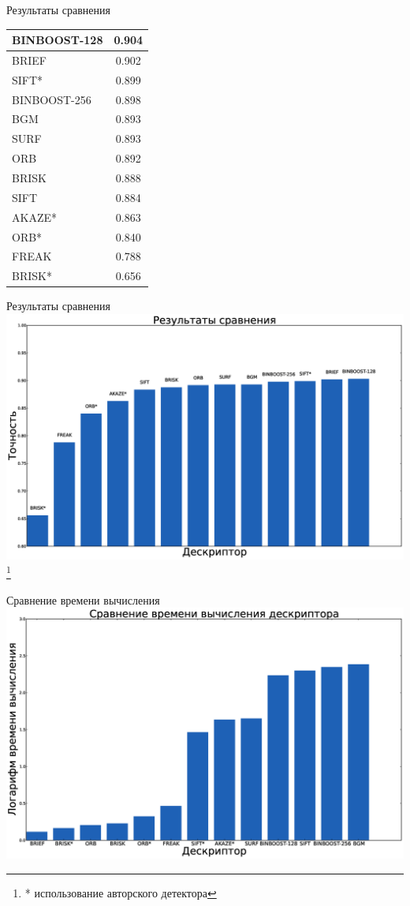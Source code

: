 \documentclass[14pt,mathserif,aspectratio=43]{beamer}
\newcommand\articlenote[1]{%
  \begingroup%
  \renewcommand\thefootnote{}\footnote{#1}%
  \addtocounter{footnote}{-1}%
  \endgroup%
}
\begin{document}
\begin{frame}{Результаты сравнения}
	
	\begin{tabular}{ | l | c | }
    \hline
    BINBOOST-128 & 0.904 \\
    \hline
	BRIEF & 0.902 \\
	\hline
	SIFT* & 0.899 \\
	\hline
	BINBOOST-256 & 0.898 \\
	\hline
	BGM & 0.893 \\
	\hline
	SURF & 0.893 \\
	\hline
	ORB & 0.892 \\
	\hline
	BRISK & 0.888 \\
	\hline
	SIFT & 0.884 \\
	\hline
	AKAZE* & 0.863 \\
	\hline
	ORB* & 0.840 \\
	\hline
	FREAK & 0.788 \\
	\hline
	BRISK* & 0.656 \\
	\hline

    \end{tabular}
\end{frame}

\begin{frame}{Результаты сравнения}
	\includegraphics[width=\linewidth]{score.eps}
	\articlenote{* использование авторского детектора}
\end{frame}

\begin{frame}{Сравнение времени вычисления}
	\includegraphics[width=\linewidth]{time.eps}
\end{frame}
\end{document}
